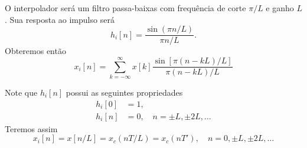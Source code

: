 \begin{frame}[allowframebreaks]
  O interpolador será um filtro passa-baixas com frequência de corte $\pi/L$ e ganho $L$.
  Sua resposta ao impulso será
  \begin{equation}
  h_i[n] = \frac{\sin (\pi n /L)}{\pi n/L} .
  \end{equation}
  Obteremos então
  \begin{equation}
  x_i[n] = \sum_{k=-\infty}^{\infty} x[k] \frac{\sin[\pi(n-kL)/L]}{\pi (n-kL)/L}
  \end{equation}

  Note que $h_i[n]$ possui as seguintes propriedades
  \begin{align}
   h_i[0] &= 1, \\
   h_i[n] &= 0,     \quad n = \pm L, \pm 2L, \ldots 
  \end{align}
  Teremos assim
  \begin{equation}
   x_i[n] = x[n/L] = x_c(nT/L) = x_c(nT'), \quad n = 0, \pm L, \pm 2L, \ldots
  \end{equation}

\end{frame}



